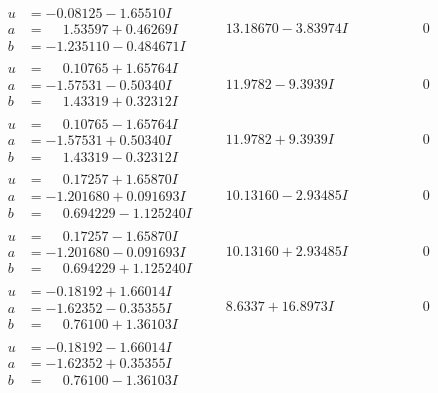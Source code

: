 \documentclass[1p]{elsarticle_modified}
\theoremstyle{definition}
\begin{document}
$$\begin{array}{c|c|c}
\begin{aligned}
u &= -0.08125 - 1.65510 I \\
a &= \phantom{-}1.53597 + 0.46269 I \\
b &= -1.235110 - 0.484671 I\end{aligned}
 & \phantom{-}13.18670 - 3.83974 I & \phantom{-0.000000 } 0 \\ \hline\begin{aligned}
u &= \phantom{-}0.10765 + 1.65764 I \\
a &= -1.57531 - 0.50340 I \\
b &= \phantom{-}1.43319 + 0.32312 I\end{aligned}
 & \phantom{-}11.9782 - 9.3939 I & \phantom{-0.000000 } 0 \\ \hline\begin{aligned}
u &= \phantom{-}0.10765 - 1.65764 I \\
a &= -1.57531 + 0.50340 I \\
b &= \phantom{-}1.43319 - 0.32312 I\end{aligned}
 & \phantom{-}11.9782 + 9.3939 I & \phantom{-0.000000 } 0 \\ \hline\begin{aligned}
u &= \phantom{-}0.17257 + 1.65870 I \\
a &= -1.201680 + 0.091693 I \\
b &= \phantom{-}0.694229 - 1.125240 I\end{aligned}
 & \phantom{-}10.13160 - 2.93485 I & \phantom{-0.000000 } 0 \\ \hline\begin{aligned}
u &= \phantom{-}0.17257 - 1.65870 I \\
a &= -1.201680 - 0.091693 I \\
b &= \phantom{-}0.694229 + 1.125240 I\end{aligned}
 & \phantom{-}10.13160 + 2.93485 I & \phantom{-0.000000 } 0 \\ \hline\begin{aligned}
u &= -0.18192 + 1.66014 I \\
a &= -1.62352 - 0.35355 I \\
b &= \phantom{-}0.76100 + 1.36103 I\end{aligned}
 & \phantom{-}8.6337 + 16.8973 I & \phantom{-0.000000 } 0 \\ \hline\begin{aligned}
u &= -0.18192 - 1.66014 I \\
a &= -1.62352 + 0.35355 I \\
b &= \phantom{-}0.76100 - 1.36103 I\end{aligned}

\end{array}$$
\end{document}
